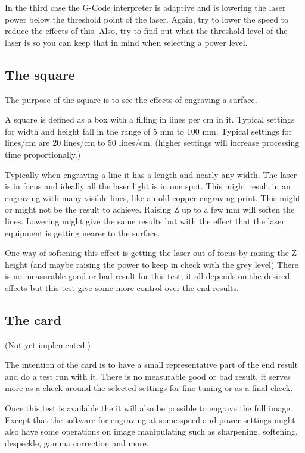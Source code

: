 In the third case the G-Code interpreter is adaptive and is lowering the laser power below the threshold point of the
laser. Again, try to lower the speed to reduce the effects of this. Also, try to find out what the threshold level of
the laser is so you can keep that in mind when selecting a power level.

\subsection{The square}
The purpose of the square is to see the effects of engraving a surface.

A square is defined as a box with a filling in lines per cm in it. Typical settings for width and height fall in the
range of 5 mm to 100 mm. Typical settings for lines/cm are 20 lines/cm to 50 lines/cm. (higher settings will increase
processing time proportionally.)

Typically when engraving a line it has a length and nearly any width. The laser is in focus and ideally all the laser
light is in one spot. This might result in an engraving with many visible lines, like an old copper engraving print.
This might or might not be the result to achieve. Raising Z up to a few mm will soften the lines. Lowering might give
the same results but with the effect that the laser equipment is getting nearer to the surface.

One way of softening this effect is getting the laser out of focus by raising the Z height
(and maybe raising the power to keep in check with the grey level) There is no measurable good or bad result for this
test, it all depends on the desired effects but this test give some more control over the end results.

\subsection{The card}
(Not yet implemented.)

The intention of the card is to have a small representative part of the end
result and do a test run with it. There is no measurable good or bad result, it serves more as a check around the
selected settings for fine tuning or as a final check.

Once this test is available the it will also be possible to engrave the full image. Except that the software for
engraving at some speed and power settings might also have some operations on image manipulating such as sharpening,
softening, despeckle, gamma correction and more.

